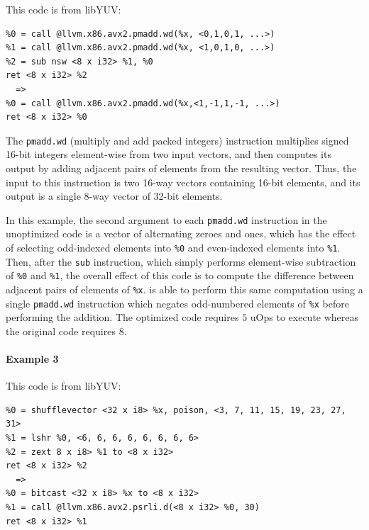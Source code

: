 This code is from libYUV:

{\begin{quoting}\begin{Verbatim}
%0 = call @llvm.x86.avx2.pmadd.wd(%x, <0,1,0,1, ...>)
%1 = call @llvm.x86.avx2.pmadd.wd(%x, <1,0,1,0, ...>)
%2 = sub nsw <8 x i32> %1, %0
ret <8 x i32> %2
  =>
%0 = call @llvm.x86.avx2.pmadd.wd(%x,<1,-1,1,-1, ...>)
ret <8 x i32> %0
\end{Verbatim}
\end{quoting}}

The \texttt{pmadd.wd} (multiply and add packed integers) instruction multiplies
signed 16-bit integers element-wise from two input vectors, and then
computes its output by adding adjacent pairs of elements from the
resulting vector.
%
Thus, the input to this instruction is two 16-way vectors containing
16-bit elements, and its output is a single 8-way vector of 32-bit
elements.


In this example, the second argument to each \texttt{pmadd.wd}
instruction in the unoptimized code is a vector of alternating zeroes
and ones, which has the effect of selecting odd-indexed elements into
\texttt{\%0} and even-indexed elements into \texttt{\%1}.
%
Then, after the \texttt{sub} instruction, which simply performs
element-wise subtraction of \texttt{\%0} and \texttt{\%1}, the overall
effect of this code is to compute the difference between adjacent
pairs of elements of \texttt{\%x}.
%
\minotaur{} is able to perform this same computation using a single
\texttt{pmadd.wd} instruction which negates odd-numbered elements of
\texttt{\%x} before performing the addition.
%
The optimized code requires $5$ uOps to execute whereas the original
code requires $8$.


\paragraph*{Example 3}

This code is from libYUV:

{\begin{quoting}\begin{Verbatim}
%0 = shufflevector <32 x i8> %x, poison, <3, 7, 11, 15, 19, 23, 27, 31>
%1 = lshr %0, <6, 6, 6, 6, 6, 6, 6, 6>
%2 = zext 8 x i8> %1 to <8 x i32>
ret <8 x i32> %2
  =>
%0 = bitcast <32 x i8> %x to <8 x i32>
%1 = call @llvm.x86.avx2.psrli.d(<8 x i32> %0, 30)
ret <8 x i32> %1
\end{Verbatim}
\end{quoting}}

